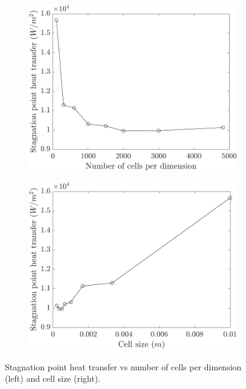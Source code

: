 \begin{figure}
    \centering
    \begin{subfigure}{0.49\textwidth}
        \centering
        \includegraphics[width=\textwidth]{Images/3. Methodology/Mesh convergence/sphnc.pdf}
    \end{subfigure}
    \hfill
    \begin{subfigure}{0.49\textwidth}
        \centering
        \includegraphics[width=\textwidth]{Images/3. Methodology/Mesh convergence/sphcs.pdf}
    \end{subfigure}
    \caption{Stagnation point heat transfer vs number of cells per dimension (left) and cell size (right).}
    \label{fig:meshstag}
\end{figure}

